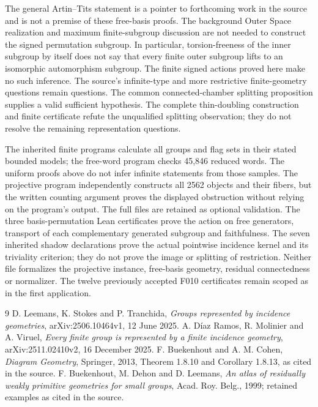 The general Artin--Tits statement is a pointer to forthcoming work in
the source and is not a premise of these free-basis proofs. The background
Outer Space realization and maximum finite-subgroup discussion are not
needed to construct the signed permutation subgroup. In particular,
torsion-freeness of the inner subgroup by itself does not say that every
finite outer subgroup lifts to an isomorphic automorphism subgroup.
The finite signed actions proved here make no such inference. The source's
infinite-type and more restrictive finite-geometry questions remain
questions. The common connected-chamber splitting proposition supplies a valid
sufficient hypothesis. The complete thin-doubling construction and finite
certificate refute the unqualified splitting observation; they do not
resolve the remaining representation questions.

The inherited finite programs calculate all groups and flag sets in their
stated bounded models; the free-word program checks 45,846 reduced words.
The uniform proofs above do not infer infinite statements from those
samples. The projective program independently constructs all 2562 objects
and their fibers, but the written counting argument proves the displayed
obstruction without relying on the program's output. The full files are
retained as optional validation. The three basis-permutation Lean
certificates prove the action on free generators, transport of each
complementary generated subgroup and faithfulness. The seven inherited
shadow declarations prove the actual pointwise incidence kernel and its
triviality criterion; they do not prove the image or splitting of
restriction. Neither file formalizes the projective instance, free-basis
geometry, residual connectedness or normalizer. The twelve previously
accepted F010 certificates remain scoped as in the first application.

\begin{thebibliography}{9}
 D. Leemans, K. Stokes and P. Tranchida,
\emph{Groups represented by incidence geometries}, arXiv:2506.10464v1,
12 June 2025.
 A. D\'iaz Ramos, R. Molinier and A. Viruel,
\emph{Every finite group is represented by a finite incidence geometry},
arXiv:2511.02410v2, 16 December 2025.
 F. Buekenhout and A. M. Cohen,
\emph{Diagram Geometry}, Springer, 2013, Theorem 1.8.10 and Corollary 1.8.13,
as cited in the source.
 F. Buekenhout, M. Dehon and D. Leemans,
\emph{An atlas of residually weakly primitive geometries for small groups},
Acad. Roy. Belg., 1999; retained examples as cited in the source.
\end{thebibliography}
